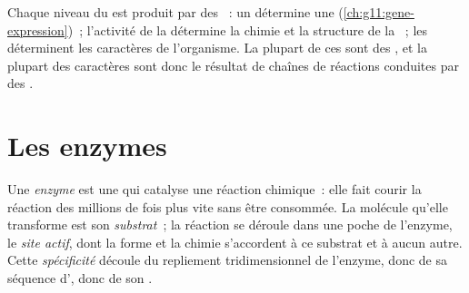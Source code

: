\begin{proposition}\label{prop:g11:enzymes-and-phenotype:proteins}
Chaque niveau du  est produit par des ~: un 
détermine une  (\cref{ch:g11:gene-expression})~; l'activité de
la  détermine la chimie et la structure de la ~; les
 déterminent les caractères de l'organisme. La plupart de ces
 sont des \emph{}, et la plupart des caractères sont
donc le résultat de chaînes de réactions conduites par des .
\end{proposition}
\admitted

\section{Les enzymes}

\begin{definition}\label{def:g11:enzymes-and-phenotype:enzyme}
Une \emph{enzyme} est une  qui catalyse une
réaction chimique~: elle fait courir la réaction des millions de fois
plus vite sans être consommée. La molécule qu'elle transforme est son
\emph{substrat}~; la réaction se déroule dans une poche
de l'enzyme, le \emph{site actif}, dont la forme et
la chimie s'accordent à ce substrat et à aucun autre. Cette
\emph{spécificité} découle du repliement tridimensionnel de l'enzyme,
donc de sa séquence d', donc de son .
\end{definition}

